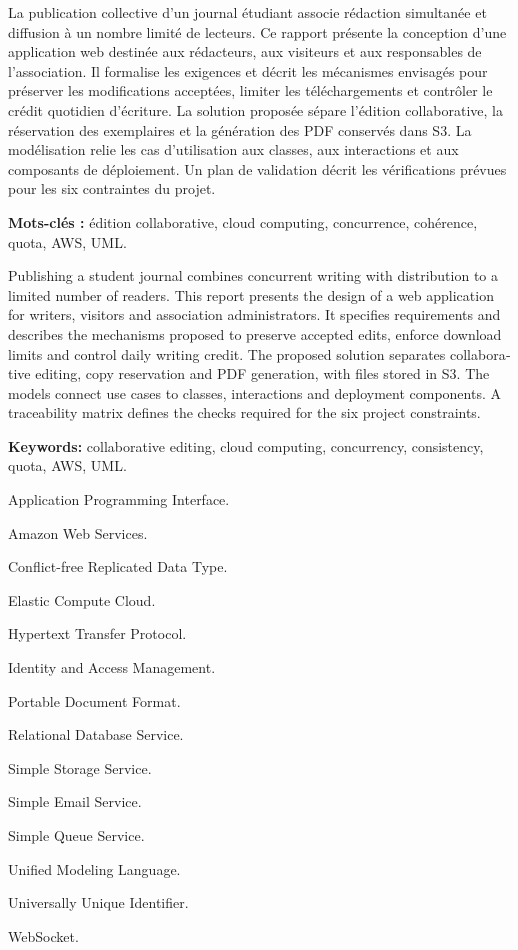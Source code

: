 La publication collective d'un journal étudiant associe rédaction simultanée et diffusion à un nombre limité de lecteurs. Ce rapport présente la conception d'une application web destinée aux rédacteurs, aux visiteurs et aux responsables de l'association. Il formalise les exigences et décrit les mécanismes envisagés pour préserver les modifications acceptées, limiter les téléchargements et contrôler le crédit quotidien d'écriture. La solution proposée sépare l'édition collaborative, la réservation des exemplaires et la génération des PDF conservés dans S3. La modélisation relie les cas d'utilisation aux classes, aux interactions et aux composants de déploiement. Un plan de validation décrit les vérifications prévues pour les six contraintes du projet.

\medskip\noindent\textbf{Mots-clés :} édition collaborative, cloud computing, concurrence, cohérence, quota, AWS, UML.

\begin{otherlanguage}{english}
Publishing a student journal combines concurrent writing with distribution to a limited number of readers. This report presents the design of a web application for writers, visitors and association administrators. It specifies requirements and describes the mechanisms proposed to preserve accepted edits, enforce download limits and control daily writing credit. The proposed solution separates collaborative editing, copy reservation and PDF generation, with files stored in S3. The models connect use cases to classes, interactions and deployment components. A traceability matrix defines the checks required for the six project constraints.

\medskip\noindent\textbf{Keywords:} collaborative editing, cloud computing, concurrency, consistency, quota, AWS, UML.
\end{otherlanguage}

\begin{description}[labelwidth=2cm,leftmargin=2.4cm]
\item[API] Application Programming Interface.
\item[AWS] Amazon Web Services.
\item[CRDT] Conflict-free Replicated Data Type.
\item[EC2] Elastic Compute Cloud.
\item[HTTP] Hypertext Transfer Protocol.
\item[IAM] Identity and Access Management.
\item[PDF] Portable Document Format.
\item[RDS] Relational Database Service.
\item[S3] Simple Storage Service.
\item[SES] Simple Email Service.
\item[SQS] Simple Queue Service.
\item[UML] Unified Modeling Language.
\item[UUID] Universally Unique Identifier.
\item[WS] WebSocket.
\end{description}

